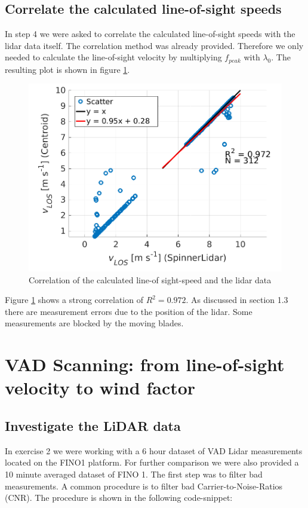\documentclass[10pt]{article}
\begin{document}
\subsection{Correlate the calculated line-of-sight speeds}
In step 4 we were asked to correlate the calculated line-of-sight speeds with the lidar data itself. The correlation method was already provided. Therefore we only needed to calculate the line-of-sight velocity by multiplying $f_{peak}$ with $\lambda_0$. The resulting plot is shown in figure \ref{fig:correlation}. 

\begin{figure}[H]
\includegraphics[width=1\linewidth]{../Exercises_and_Tasks/ex1/figures/correlation.png}
\caption{Correlation of the calculated line-of sight-speed and the lidar data}
\label{fig:correlation}
\end{figure}

Figure \ref{fig:correlation} shows a strong correlation of $R^2 = 0.972$. As discussed in section 1.3 there are measurement errors due to the position of the lidar. Some measurements are blocked by the moving blades. 
\newpage
\section{VAD Scanning: from line-of-sight velocity to wind factor}
\subsection{Investigate the LiDAR data}
In exercise 2 we were working with a 6 hour dataset of VAD Lidar measurements located on the FINO1 platform. For further comparison we were also provided a 10 minute averaged dataset of FINO 1.
The first step was to filter bad measurements. A common procedure is to filter bad Carrier-to-Noise-Ratios (CNR). 
The procedure is shown in the following code-snippet:
\end{document}
